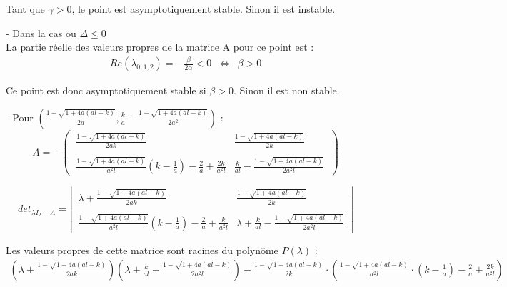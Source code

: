 \documentclass{article}
\begin{document}
Tant que $\gamma > 0$, le point est asymptotiquement stable.
Sinon il est instable.

\vfill
\noindent
- Dans la cas ou $\Delta \leqslant 0$\\

La partie réelle des valeurs propres de la matrice A pour ce point est : 
\begin{equation*}
    \begin{array}{lll}
        Re(\lambda_{0,1,2}) = - \frac{\beta}{2\alpha} < 0 &
        \Leftrightarrow &
        \beta > 0
    \end{array}
\end{equation*}

Ce point est donc asymptotiquement stable si $\beta > 0$. Sinon il est non stable.


\newpage

\vfill
\noindent
- Pour $\left(\frac{1 - \sqrt{1 + 4a(al -k)}}{2a}, \frac{k}{a} - \frac{1 - \sqrt{1 + 4a(al -k)}}{2a^2}\right)$ :
\begin{equation*}
    A = -
    \begin{pmatrix}
        \ \frac{1 - \sqrt{1 + 4a(al -k)}}{2ak} & \frac{1 - \sqrt{1 + 4a(al -k)}}{2k} \phantom{\ }\\\\
        \ \frac{1 - \sqrt{1 + 4a(al -k)}}{a^2 l}(k - \frac{1}{a}) - \frac{2}{a} + \frac{2k}{a^2 l} & \frac{k}{al} - \frac{1 - \sqrt{1 + 4a(al -k)}}{2a^2 l} \phantom{\ }
    \end{pmatrix}
\end{equation*}

\begin{equation*}
    det_{\lambda I_2 - A} = 
    \left|
    \begin{array}{lr}
       \ \lambda + \frac{1 - \sqrt{1 + 4a(al -k)}}{2ak} & \frac{1 - \sqrt{1 + 4a(al -k)}}{2k} \phantom{\ }\\\\
        \ \frac{1 - \sqrt{1 + 4a(al -k)}}{a^2 l}(k - \frac{1}{a}) - \frac{2}{a} + \frac{k}{a^2 l} & \lambda + \frac{k}{al} - \frac{1 - \sqrt{1 + 4a(al -k)}}{2a^2 l} \phantom{\ }
    \end{array}
    \right|
\end{equation*}

Les valeurs propres de cette matrice sont racines du polynôme $P(\lambda)$ :
\begin{equation*}
\begin{array}{l}
    \left(\lambda + \frac{1 - \sqrt{1 + 4a(al -k)}}{2ak}\right)
    \left( \lambda + \frac{k}{al} - \frac{1 - \sqrt{1 + 4a(al -k)}}{2a^2 l} \right)
    - \frac{1-\sqrt{1 + 4a(al -k)}}{2k} \cdot \left( \frac{1 - \sqrt{1 + 4a(al -k)}}{a^2 l} \cdot \left(k - \frac{1}{a} \right) - \frac{2}{a} + \frac{2k}{a^2 l} \right)
\end{array}
\end{equation*}
\end{document}
